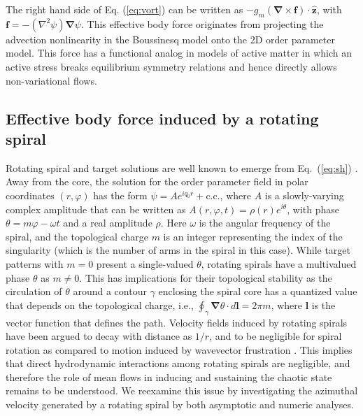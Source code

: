 \documentclass[preprint,prx,floatfix]{revtex4-1}
\begin{document}
The right hand side of Eq. (\ref{eq:vort}) can be written as $-g_m({\bm \nabla} \times \mathbf{f}) \cdot \hat{\mathbf z}$, with $\mathbf{f} = -(\nabla^2\psi){\bm \nabla}\psi$. This effective body force originates from projecting the advection nonlinearity in the Boussinesq model onto the 2D order parameter model. This force has a functional analog in models of active matter in which an active stress breaks equilibrium symmetry relations \cite{marchetti2013hydrodynamics,tiribocchi2015active,kirkpatrick2019driven} and hence directly allows non-variational flows.

\subsection{Effective body force induced by a rotating spiral}
\label{sec:ibf}

Rotating spiral and target solutions are well known to emerge from Eq.~(\ref{eq:sh}) \cite{pismen1999vortices}. Away from the core, the solution for the order parameter field in polar coordinates $(r,\varphi)$ has the form $\psi = A e^{iq_0r} + \textrm{c.c.}$, where $A$ is a slowly-varying complex amplitude that can be written as $A(r,\varphi,t) = \rho(r)e^{i\theta}$, with phase $\theta = m\varphi - \omega t$ and a real amplitude $\rho$. Here $\omega$ is the angular frequency of the spiral, and the topological charge $m$ is an integer representing the index of the singularity \cite{pismen1991mobility} (which is the number of arms in the spiral in this case). While target patterns with $m = 0$ present a single-valued $\theta$, rotating spirals have a multivalued phase $\theta$ as $m \neq 0$. This has implications for their topological stability \cite{pismen1991mobility} as the circulation of $\theta$ around a contour $\gamma$ enclosing the spiral core has a quantized value that depends on the topological charge, i.e., $\oint_\gamma \bm{\nabla}\theta \cdot d\mathbf{l} = 2 \pi m$, where $\mathbf{l}$ is the vector function that defines the path. Velocity fields induced by rotating spirals have been argued to decay with distance as $1/r$, and to be negligible for spiral rotation as compared to motion induced by wavevector frustration \cite{cross1996theoretical}. This implies that direct hydrodynamic interactions among rotating spirals are negligible, and therefore the role of mean flows in inducing and sustaining the chaotic state remains to be understood. We reexamine this issue by investigating the azimuthal velocity generated by a rotating spiral by both asymptotic and numeric analyses.
\end{document}
